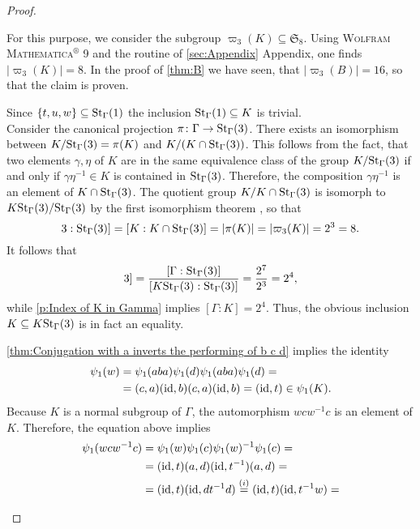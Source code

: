 \begin{proof}
\begin{plist}
For this purpose, we consider the subgroup $\varpi_3(K)\subseteq \mathfrak{S}_8$. Using \textsc{Wolfram Mathematica$^\circledR$ 9} and the routine of \ref{sec:Appendix} Appendix, one finds $\lvert\varpi_3(K)\rvert=8$. In the proof of \cref{thm:B} we have seen, that $\lvert\varpi_3(B)\rvert=16$, so that the claim is proven.
\item Since $\lbrace t,u,w\rbrace\subseteq\St[\Gamma]{1}$ the inclusion $\St[\Gamma]{1}\subseteq K$ is trivial.\\
Consider the canonical projection $\pi\colon\Gamma\to\St[\Gamma]{3}$. There exists an isomorphism between $\nicefrac{K}{\St[\Gamma]{3}}=\pi(K)$ and $\nicefrac{K}{(K\cap\St[\Gamma]{3})}$. This follows from the fact, that two elements $\gamma,\eta$ of $K$ are in the same equivalence class of the group $\nicefrac{K}{\St[\Gamma]{3}}$ if and only if $\gamma\eta^{-1}\in K$ is contained in $\St[\Gamma]{3}$. Therefore, the composition $\gamma\eta^{-1}$ is an element of $K\cap\St[\Gamma]{3}$. The quotient group $\nicefrac{K}{K\cap\St[\Gamma]{3}}$ is isomorph to $\nicefrac{K\St[\Gamma]{3}}{\St[\Gamma]{3}}$ by the first isomorphism theorem , so that
\begin{equation*}
[K\St[\Gamma]{3}:\St[\Gamma]{3}]=[K:K\cap\St[\Gamma]{3}]=\lvert \pi(K)\rvert=\lvert\varpi_3(K)\rvert=2^3=8.
\end{equation*}
It follows that
\begin{equation*}
[\Gamma:K\St[\Gamma]{3}]=\frac{[\Gamma:\St[\Gamma]{3}]}{[K\St[\Gamma]{3}:\St[\Gamma]{3}]}=\frac{2^7}{2^3}=2^4,
\end{equation*}
while \ref{p:Index of K in Gamma} implies $[\Gamma:K]=2^4.$ Thus, the obvious inclusion $K\subseteq K\St[\Gamma]{3}$ is in fact an equality.
\item \label{p:Base Case psi(K) contains K} \cref{thm:Conjugation with a inverts the performing of b c d} implies the identity
\begin{align*}
\psi_1(w)	&=\psi_1(aba)\psi_1(d)\psi_1(aba)\psi_1(d)=\\
			&=(c,a)(\id,b)(c,a)(\id,b)=(\id,t)\in\psi_1(K).
\end{align*}
Because $K$ is a normal subgroup of $\Gamma$, the automorphism $wcw^{-1}c$ is an element of $K$. Therefore, the equation above implies
\begin{align*}
\psi_1(wcw^{-1}c)	&=\psi_1(w)\psi_1(c)\psi_1(w)^{-1}\psi_1(c)=\\
					&=(\id,t)(a,d)(\id,t^{-1})(a,d)=\\
					&=(\id,t)(\id,dt^{-1}d)\overset{(i)}{=}(\id,t)(\id,t^{-1}w)=\\

\end{align*}
\end{plist}
\end{proof}
